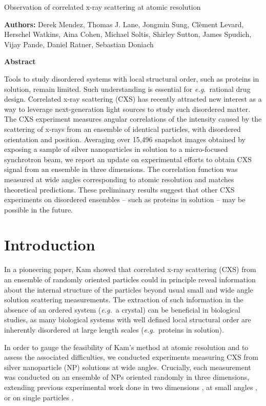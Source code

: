 \documentclass [11pt,fleqn]{article}
\def \hfb {\hfill\break}
\begin{document}
 
\hspace{1cm}{\bf Title:} Observation of correlated x-ray scattering at atomic resolution \hfb
 
{\bf Authors:} Derek Mendez, Thomas J. Lane, Jongmin Sung,  Cl\`ement Levard, Herschel Watkins, Aina Cohen, Michael Soltis, Shirley Sutton, James Spudich, Vijay Pande,  Daniel Ratner, Sebastian Doniach

{\bf Abstract}

Tools to study disordered systems with local structural order, such as proteins in solution, remain limited. Such understanding is essential for \emph{e.g.}~rational drug design. Correlated x-ray scattering (CXS) has recently attracted new interest as a way to leverage next-generation light sources to study such disordered matter. The CXS experiment measures angular correlations of the intensity caused by the scattering of x-rays from an ensemble of identical particles, with disordered orientation and position. Averaging over 15,496 snapshot images obtained by exposing a sample of silver nanoparticles in solution to a micro-focused synchrotron beam, we report an update on experimental efforts to obtain CXS signal from an ensemble in three dimensions. The correlation function was measured at  wide angles corresponding to atomic resolution and matches theoretical predictions. These preliminary results suggest that other CXS experiments on disordered ensembles -- such as proteins in solution -- may be possible in the future.


\section{Introduction}

In a pioneering paper, Kam \cite{Kam:1977wc} showed that correlated x-ray scattering (CXS) from an ensemble of randomly oriented particles could in principle reveal information about the internal structure of the particles beyond usual small and wide angle solution scattering measurements. The extraction of such information in the absence of an ordered system (\textit{e.g.}~a crystal) can be beneficial in biological studies, as many biological systems with well defined local structural order are inherently disordered at large length scales (\textit{e.g.}~proteins in solution).

In order to gauge the feasibility of Kam's method at atomic resolution and to assess the associated difficulties, we conducted experiments measuring CXS from silver nanoparticle (NP) solutions at wide angles. Crucially, each measurement was conducted on an ensemble of NPs oriented randomly in three dimensions, extending previous experimental work done in two dimensions \cite{Saldin:2011ch}, at small angles \cite{Kam:1981ua, Wochner:2009ia}, or on single particles \cite{Kam:1985tz, Starodub:1fy}. 
\end{document}
